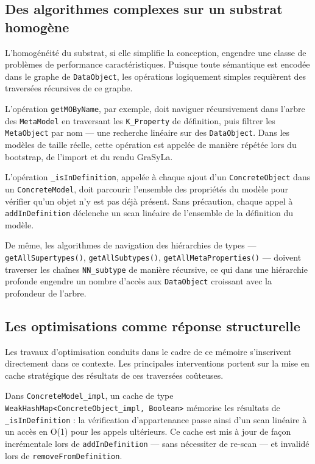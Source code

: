 \subsection{Des algorithmes complexes sur un substrat homogène}

L'homogénéité du substrat, si elle simplifie la conception, engendre une
classe de problèmes de performance caractéristiques. Puisque toute
sémantique est encodée dans le graphe de \texttt{DataObject}, les
opérations logiquement simples requièrent des traversées récursives de ce
graphe.

L'opération \texttt{getMOByName}, par exemple, doit naviguer
récursivement dans l'arbre des \texttt{MetaModel} en traversant les
\texttt{K\_Property} de définition, puis filtrer les \texttt{MetaObject}
par nom --- une recherche linéaire sur des \texttt{DataObject}. Dans les
modèles de taille réelle, cette opération est appelée de manière répétée
lors du bootstrap, de l'import et du rendu GraSyLa.

L'opération \texttt{\_isInDefinition}, appelée à chaque ajout d'un
\texttt{ConcreteObject} dans un \texttt{ConcreteModel}, doit parcourir
l'ensemble des propriétés du modèle pour vérifier qu'un objet n'y est
pas déjà présent. Sans précaution, chaque appel à
\texttt{addInDefinition} déclenche un scan linéaire de l'ensemble de la
définition du modèle.

De même, les algorithmes de navigation des hiérarchies de types ---
\texttt{getAllSupertypes()}, \texttt{getAllSubtypes()},
\texttt{getAllMetaProperties()} --- doivent traverser les chaînes
\texttt{NN\_subtype} de manière récursive, ce qui dans une hiérarchie
profonde engendre un nombre d'accès aux \texttt{DataObject} croissant
avec la profondeur de l'arbre.

\subsection{Les optimisations comme réponse structurelle}

Les travaux d'optimisation conduits dans le cadre de ce mémoire
s'inscrivent directement dans ce contexte. Les principales interventions
portent sur la mise en cache stratégique des résultats de ces traversées
coûteuses.

Dans \texttt{ConcreteModel\_impl}, un cache de type
\texttt{WeakHashMap<ConcreteObject\_impl, Boolean>} mémorise les
résultats de \texttt{\_isInDefinition} : la vérification d'appartenance
passe ainsi d'un scan linéaire à un accès en O(1) pour les appels
ultérieurs. Ce cache est mis à jour de façon incrémentale lors de
\texttt{addInDefinition} --- sans nécessiter de re-scan --- et invalidé
lors de \texttt{removeFromDefinition}.

